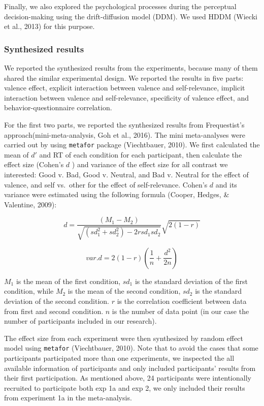 \documentclass[
  english,
  man]{apa6}
\begin{document}
Finally, we also explored the psychological processes during the perceptual decision-making using the drift-diffusion model (DDM). We used HDDM (Wiecki et al., 2013) for this purpose.

\hypertarget{synthesized-results}{%
\subsubsection{Synthesized results}\label{synthesized-results}}

We reported the synthesized results from the experiments, because many of them shared the similar experimental design. We reported the results in five parts: valence effect, explicit interaction between valence and self-relevance, implicit interaction between valence and self-relevance, specificity of valence effect, and behavior-questionnaire correlation.

For the first two parts, we reported the synthesized results from Frequestist's approach(mini-meta-analysis, Goh et al., 2016). The mini meta-analyses were carried out by using \texttt{metafor} package (Viechtbauer, 2010). We first calculated the mean of \(d'\) and RT of each condition for each participant, then calculate the effect size (Cohen's \(d\) ) and variance of the effect size for all contrast we interested: Good v. Bad, Good v. Neutral, and Bad v. Neutral for the effect of valence, and self vs.~other for the effect of self-relevance. Cohen's \(d\) and its variance were estimated using the following formula (Cooper, Hedges, \& Valentine, 2009):

\[d = \frac {(M_{1} - M_{2})}{\sqrt {(sd_{1}^2 + sd_{2}^2) - 2rsd_{1}sd_{2}}}  \sqrt {2(1-r)}\]

\[var.d = 2 (1-r)  (\frac{1}{n} + \frac{d^2}{2n})\]

\(M_1\) is the mean of the first condition, \(sd_1\) is the standard deviation of the first condition, while \(M_2\) is the mean of the second condition, \(sd_2\) is the standard deviation of the second condition. \(r\) is the correlation coefficient between data from first and second condition. \(n\) is the number of data point (in our case the number of participants included in our research).

The effect size from each experiment were then synthesized by random effect model using \texttt{metafor} (Viechtbauer, 2010). Note that to avoid the cases that some participants participated more than one experiments, we inspected the all available information of participants and only included participants' results from their first participation. As mentioned above, 24 participants were intentionally recruited to participate both exp 1a and exp 2, we only included their results from experiment 1a in the meta-analysis.
\end{document}
